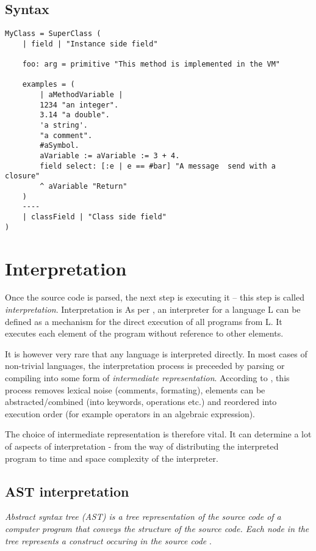 \documentclass[thesis=M,english]{FITthesis}[2019/12/23]
\begin{document}
\subsection{Syntax}
\begin{lstlisting}[language=Smalltalk]
MyClass = SuperClass (
	| field | "Instance side field"
	
	foo: arg = primitive "This method is implemented in the VM"

	examples = (
		| aMethodVariable |
		1234 "an integer".
		3.14 "a double".
		'a string'.
		"a comment".
		#aSymbol.
		aVariable := aVariable := 3 + 4.
		field select: [:e | e == #bar] "A message  send with a closure"
		^ aVariable "Return"
	)
	----
	| classField | "Class side field"
)
\end{lstlisting}

\section{Interpretation}
Once the source code is parsed, the next step is executing it -- this step is called \textit{interpretation}. Interpretation is
As per \cite{wolczko-02-ast-interpret}, an interpreter for a language L can be defined as a mechanism for the direct execution of all programs
from L. It executes each element of the program without reference to other elements.

It is however very rare that any language is interpreted directly. In most cases of non-trivial languages, the interpretation process
is preceeded by parsing or compiling into some form of \textit{intermediate representation}. According to \cite{wolczko-02-ast-interpret},
this process removes lexical noise (comments, formating), elements can be abstracted/combined (into keywords, operations etc.) and reordered
into execution order (for example operators in an algebraic expression).

The choice of intermediate representation is therefore vital. It can determine a lot of aspects of interpretation - from the way of distributing
the interpreted program to time and space complexity of the interpreter.

\subsection{AST interpretation}
\textit{Abstract syntax tree (AST) is a tree representation of the source code of a computer program that conveys the structure of the source code.
Each node in the tree represents a construct occuring in the source code }\cite{deepsource-ast}.
\end{document}
